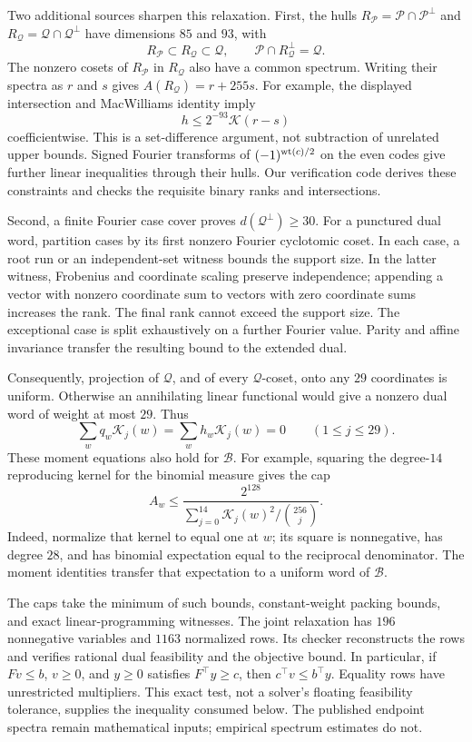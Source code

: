 Two additional sources sharpen this relaxation.
First, the hulls $R_{\mathcal P}=\mathcal P\cap \mathcal P^\perp$ and $R_{\mathcal Q}=\mathcal Q\cap \mathcal Q^\perp$ have dimensions
$85$ and $93$, with
\[
 R_{\mathcal P}\subset R_{\mathcal Q}\subset \mathcal Q,\qquad \mathcal P\cap R_{\mathcal Q}^\perp=\mathcal Q.
\]
The nonzero cosets of $R_{\mathcal P}$ in $R_{\mathcal Q}$ also have a common spectrum.
Writing their spectra as $r$ and $s$ gives $A(R_{\mathcal Q})=r+255s$.
For example, the displayed intersection and MacWilliams identity imply
\[
 h\le 2^{-93}\mathcal K(r-s)
\]
coefficientwise. This is a set-difference argument, not subtraction of
unrelated upper bounds. Signed Fourier transforms of
$(-1)^{\operatorname{wt}(c)/2}$ on the even codes give further linear inequalities through
their hulls. Our verification code derives these constraints and checks the requisite
binary ranks and intersections.

Second, a finite Fourier case cover proves $d(\mathcal Q^\perp)\ge30$.
For a punctured dual word, partition cases by its first nonzero Fourier
cyclotomic coset. In each case, a root run or an independent-set witness
bounds the support size. In the latter witness, Frobenius and coordinate
scaling preserve independence; appending a vector with nonzero coordinate
sum to vectors with zero coordinate sums increases the rank. The final
rank cannot exceed the support size. The exceptional case is split
exhaustively on a further Fourier value. Parity and affine invariance
transfer the resulting bound to the extended dual.

Consequently, projection of $\mathcal Q$, and of every $\mathcal Q$-coset, onto any $29$
coordinates is uniform. Otherwise an annihilating linear functional would
give a nonzero dual word of weight at most $29$.
Thus
\[
 \sum_w q_w\mathcal K_j(w)=\sum_w h_w\mathcal K_j(w)=0
 \qquad(1\le j\le29).
\]
These moment equations also hold for $\mathcal B$.
For example, squaring the degree-$14$ reproducing kernel for the binomial
measure gives the cap
\begin{equation}
 A_w\le
 \frac{2^{128}}{\displaystyle\sum_{j=0}^{14}
             \mathcal K_j(w)^2/\binom{256}{j}}.
 \label{eq:finite-christoffel-cap}
\end{equation}
Indeed, normalize that kernel to equal one at $w$; its square is
nonnegative, has degree $28$, and has binomial expectation equal to the
reciprocal denominator. The moment identities transfer that expectation to
a uniform word of $\mathcal B$.

The caps take the minimum of such bounds, constant-weight packing
bounds, and exact linear-programming witnesses. The joint relaxation has
$196$ nonnegative variables and $1163$ normalized rows.
Its checker reconstructs the rows and verifies rational dual feasibility
and the objective bound. In particular, if $Fv\le b$, $v\ge0$, and
$y\ge0$ satisfies $F^\top y\ge c$, then $c^\top v\le b^\top y$.
Equality rows have unrestricted multipliers. This exact test, not a solver's
floating feasibility tolerance, supplies the inequality consumed below.
The published endpoint spectra remain mathematical inputs; empirical
spectrum estimates do not.

